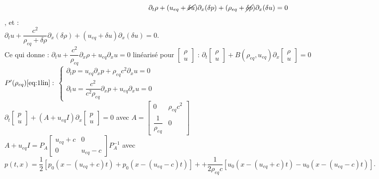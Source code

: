 \documentclass[12pt,a4paper]{article}
\begin{document}
\begin{sol}
\begin{enumerate}
\begin{minipage}{17cm}
			\begin{equation}\label{eq:1lin}
				\partial_t\rho + (u_{eq}+\cancel{\delta u})\partial_x(\delta p) + (\rho_{eq} + \cancel{\delta p})\partial_x(\delta u) = 0
			\end{equation}
			, et :\\
			$\partial_t u + \dfrac{c^2}{\rho_{eq}+\delta\rho}\partial_x(\delta\rho) + (u_{eq}+\delta u)\partial_x (\delta u) = 0$.\\
			Ce qui donne : $\partial_t u + \dfrac{c^2}{\rho_{eq}}\partial_x\rho + u_{eq}\partial_x u = 0$ linéarisé pour $\begin{bmatrix}
				\rho \\
				u
			\end{bmatrix}$ : $\partial_t \begin{bmatrix}
			\rho \\
			u
			\end{bmatrix} + B(\rho_{eq},u_{eq})\partial_x\begin{bmatrix}
			\rho\\
			u
			\end{bmatrix}=0$\\
			$P'(\rho_{eq})\ref{eq:1lin} :$ $\begin{cases}
				\partial_t p = u_{eq} \partial_x p + \rho_{eq}c^2 \partial_x u =0\\
				\partial_t u = \dfrac{c^2}{c^2\rho_{eq}}\partial_x p + u_{eq}\partial_x u = 0
			\end{cases}$\\
			$\partial_t \begin{bmatrix}
				p \\
				u
			\end{bmatrix} + (A+u_{eq}I)\partial_x \begin{bmatrix}
			p \\
			u
			\end{bmatrix} = 0$ avec $A = \begin{bmatrix}
			0 & \rho_{eq}c^2\\
			\dfrac1{\rho_{eq}} & 0
			\end{bmatrix}$\\
			$A+u_{eq} I = P_A\begin{bmatrix}
				u_{eq}+c & 0 \\
				0 & u_{eq}-c
			\end{bmatrix}P_A^{-1}$ avec $p(t,x) = \dfrac12\left[p_0(x-(u_{eq}+c)t)+p_0(x-(u_{eq}-c)t)\right]++\dfrac{1}{2\rho_{eq}c}\left[u_0(x-(u_{eq}+c)t)-u_0(x-(u_{eq}-c)t)\right]$.
		\end{minipage}
		\end{enumerate}
	\end{sol}
	
	
	
\end{document}
